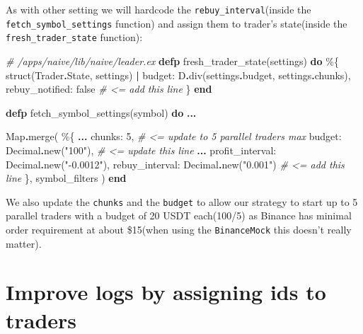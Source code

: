 \documentclass[
  oneside]{book}
\newenvironment{Shaded}{\begin{snugshade}}{\end{snugshade}}
\newcommand{\CommentTok}[1]{\textcolor[rgb]{0.56,0.35,0.01}{\textit{#1}}}
\newcommand{\ConstantTok}[1]{\textcolor[rgb]{0.00,0.00,0.00}{#1}}
\newcommand{\DecValTok}[1]{\textcolor[rgb]{0.00,0.00,0.81}{#1}}
\newcommand{\KeywordTok}[1]{\textcolor[rgb]{0.13,0.29,0.53}{\textbf{#1}}}
\newcommand{\NormalTok}[1]{#1}
\newcommand{\OperatorTok}[1]{\textcolor[rgb]{0.81,0.36,0.00}{\textbf{#1}}}
\newcommand{\StringTok}[1]{\textcolor[rgb]{0.31,0.60,0.02}{#1}}
\newcommand{\VariableTok}[1]{\textcolor[rgb]{0.00,0.00,0.00}{#1}}
\begin{document}
As with other setting we will hardcode the \texttt{rebuy\_interval}(inside the \texttt{fetch\_symbol\_settings} function) and assign them to
trader's state(inside the \texttt{fresh\_trader\_state} function):

\begin{Shaded}
\begin{Highlighting}[]
  \CommentTok{\# /apps/naive/lib/naive/leader.ex}
  \KeywordTok{defp}\NormalTok{ fresh\_trader\_state(settings) }\KeywordTok{do}
\NormalTok{    \%\{}
\NormalTok{      struct(}\ConstantTok{Trader}\OperatorTok{.}\ConstantTok{State}\NormalTok{, settings)}
      \OperatorTok{|} \VariableTok{budget:}\NormalTok{ D}\OperatorTok{.}\NormalTok{div(settings}\OperatorTok{.}\NormalTok{budget, settings}\OperatorTok{.}\NormalTok{chunks),}
        \VariableTok{rebuy\_notified:} \ConstantTok{false} \CommentTok{\# \textless{}= add this line}
\NormalTok{    \}}
  \KeywordTok{end}

  \KeywordTok{defp}\NormalTok{ fetch\_symbol\_settings(symbol) }\KeywordTok{do}
    \OperatorTok{...}

    \ConstantTok{Map}\OperatorTok{.}\NormalTok{merge(}
\NormalTok{      \%\{}
        \OperatorTok{...}
        \VariableTok{chunks:} \DecValTok{5}\NormalTok{, }\CommentTok{\# \textless{}= update to 5 parallel traders max}
        \VariableTok{budget:} \ConstantTok{Decimal}\OperatorTok{.}\NormalTok{new(}\StringTok{"100"}\NormalTok{), }\CommentTok{\# \textless{}= update this line}
        \OperatorTok{...}
        \VariableTok{profit\_interval:} \ConstantTok{Decimal}\OperatorTok{.}\NormalTok{new(}\StringTok{"{-}0.0012"}\NormalTok{),}
        \VariableTok{rebuy\_interval:} \ConstantTok{Decimal}\OperatorTok{.}\NormalTok{new(}\StringTok{"0.001"}\NormalTok{) }\CommentTok{\# \textless{}= add this line}
\NormalTok{      \},}
\NormalTok{      symbol\_filters}
\NormalTok{    )}
  \KeywordTok{end}
\end{Highlighting}
\end{Shaded}

We also update the \texttt{chunks} and the \texttt{budget} to allow our strategy to start up to 5 parallel traders with a budget of 20 USDT each(100/5) as Binance has minimal order requirement at about \$15(when using the \texttt{BinanceMock} this doesn't really matter).

\hypertarget{improve-logs-by-assigning-ids-to-traders}{%
\section{Improve logs by assigning ids to traders}\label{improve-logs-by-assigning-ids-to-traders}}
\end{document}
